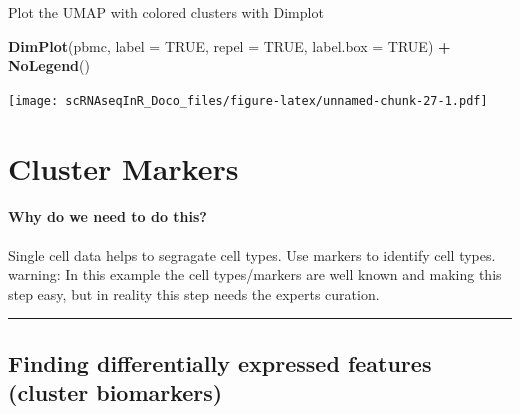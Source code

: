 \documentclass[
]{book}
\newenvironment{Shaded}{\begin{snugshade}}{\end{snugshade}}
\newcommand{\AttributeTok}[1]{\textcolor[rgb]{0.13,0.29,0.53}{#1}}
\newcommand{\CommentTok}[1]{\textcolor[rgb]{0.56,0.35,0.01}{\textit{#1}}}
\newcommand{\ConstantTok}[1]{\textcolor[rgb]{0.56,0.35,0.01}{#1}}
\newcommand{\FloatTok}[1]{\textcolor[rgb]{0.00,0.00,0.81}{#1}}
\newcommand{\FunctionTok}[1]{\textcolor[rgb]{0.13,0.29,0.53}{\textbf{#1}}}
\newcommand{\NormalTok}[1]{#1}
\newcommand{\OtherTok}[1]{\textcolor[rgb]{0.56,0.35,0.01}{#1}}
\newcommand{\SpecialCharTok}[1]{\textcolor[rgb]{0.81,0.36,0.00}{\textbf{#1}}}
\begin{document}
\begin{Shaded}
\end{Shaded}

Plot the UMAP with colored clusters with Dimplot

\begin{Shaded}
\begin{Highlighting}[]
\FunctionTok{DimPlot}\NormalTok{(pbmc, }\AttributeTok{label =} \ConstantTok{TRUE}\NormalTok{, }\AttributeTok{repel =} \ConstantTok{TRUE}\NormalTok{, }\AttributeTok{label.box =} \ConstantTok{TRUE}\NormalTok{) }\SpecialCharTok{+} \FunctionTok{NoLegend}\NormalTok{()}
\end{Highlighting}
\end{Shaded}

\texttt{[image: scRNAseqInR\_Doco\_files/figure-latex/unnamed-chunk-27-1.pdf]}

\hypertarget{clustermarkers}{%
\chapter{Cluster Markers}\label{clustermarkers}}

\hypertarget{why-do-we-need-to-do-this-1}{%
\subsubsection*{Why do we need to do this?}\label{why-do-we-need-to-do-this-1}}

Single cell data helps to segragate cell types. Use markers to identify cell types. warning: In this example the cell types/markers are well known and making this step easy, but in reality this step needs the experts curation.

\begin{center}\rule{0.5\linewidth}{0.5pt}\end{center}

\hypertarget{finding-differentially-expressed-features-cluster-biomarkers}{%
\section{Finding differentially expressed features (cluster biomarkers)}\label{finding-differentially-expressed-features-cluster-biomarkers}}
\end{document}
